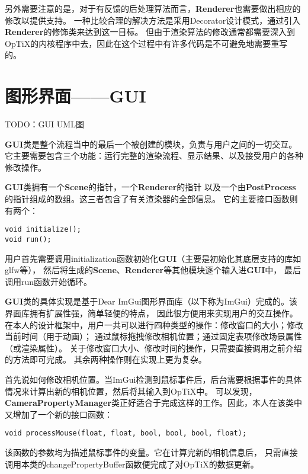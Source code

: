 另外需要注意的是，对于有反馈的后处理算法而言，\textbf{Renderer}也需要做出相应的修改以提供支持。
一种比较合理的解决方法是采用Decorator设计模式，通过引入\textbf{Renderer}的修饰类来达到这一目标。
但由于渲染算法的修改通常都需要深入到OpTiX的内核程序中去，因此在这个过程中有许多代码是不可避免地需要重写的。

\section{图形界面——GUI}

TODO：GUI UML图

\textbf{GUI}类是整个流程当中的最后一个被创建的模块，负责与用户之间的一切交互。
它主要需要包含三个功能：运行完整的渲染流程、显示结果、以及接受用户的各种修改操作。

\textbf{GUI}类拥有一个\textbf{Scene}的指针，一个\textbf{Renderer}的指针
以及一个由\textbf{PostProcess}的指针组成的数组。这三者包含了有关渲染器的全部信息。
它的主要接口函数则有两个：
\lstset{language=C++}
\begin{lstlisting}
void initialize();
void run();
\end{lstlisting}

用户首先需要调用initialization函数初始化\textbf{GUI}（主要是初始化其底层支持的库如glfw等），
然后将生成的\textbf{Scene}、\textbf{Renderer}等其他模块逐个输入进\textbf{GUI}中，
最后调用run函数开始循环。

\textbf{GUI}类的具体实现是基于Dear ImGui图形界面库\cite{Imgui}（以下称为ImGui）完成的。该界面库拥有扩展性强，简单轻便的特点，
因此很方便用来实现用户的交互操作。在本人的设计框架中，用户一共可以进行四种类型的操作：修改窗口的大小；修改当前时间（用于动画）；
通过鼠标拖拽修改相机位置；通过固定表项修改场景属性（或渲染属性）。
关于修改窗口大小、修改时间的操作，只需要直接调用之前介绍的方法即可完成。
其余两种操作则在实现上更为复杂。

首先说如何修改相机位置。当ImGui检测到鼠标事件后，后台需要根据事件的具体情况来计算出新的相机位置，然后将其输入到OpTiX中。
可以发现，\textbf{CameraPropertyManager}类正好适合于完成这样的工作。因此，本人在该类中又增加了一个新的接口函数：

\lstset{language=C++}
\begin{lstlisting}
void processMouse(float, float, bool, bool, bool, float);
\end{lstlisting}

该函数的参数均为描述鼠标事件的变量。它在计算完新的相机信息后，
只需直接调用本类的changePropertyBuffer函数便完成了对OpTiX的数据更新。

